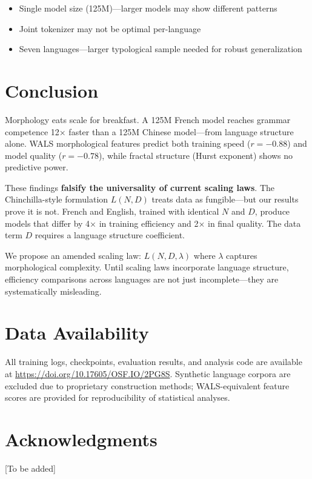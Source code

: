 \documentclass[11pt]{article}
\begin{document}
\begin{itemize}
    \item Single model size (125M)—larger models may show different patterns
    \item Joint tokenizer may not be optimal per-language
    \item Seven languages—larger typological sample needed for robust generalization
\end{itemize}

\section{Conclusion}

Morphology eats scale for breakfast. A 125M French model reaches grammar competence 12× faster than a 125M Chinese model—from language structure alone. WALS morphological features predict both training speed ($r=-0.88$) and model quality ($r=-0.78$), while fractal structure (Hurst exponent) shows no predictive power.

These findings \textbf{falsify the universality of current scaling laws}. The Chinchilla-style formulation $L(N,D)$ treats data as fungible—but our results prove it is not. French and English, trained with identical $N$ and $D$, produce models that differ by 4× in training efficiency and 2× in final quality. The data term $D$ requires a language structure coefficient.

We propose an amended scaling law: $L(N, D, \lambda)$ where $\lambda$ captures morphological complexity. Until scaling laws incorporate language structure, efficiency comparisons across languages are not just incomplete—they are systematically misleading.

\section*{Data Availability}

All training logs, checkpoints, evaluation results, and analysis code are available at \url{https://doi.org/10.17605/OSF.IO/2PG8S}. Synthetic language corpora are excluded due to proprietary construction methods; WALS-equivalent feature scores are provided for reproducibility of statistical analyses.

\section*{Acknowledgments}

[To be added]
\end{document}
